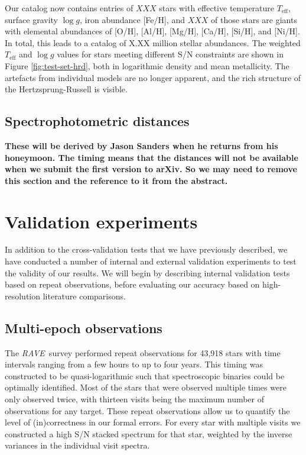 \documentclass[preprint,trackchanges]{aastex}
\newcommand{\acronym}[1]{{\small{#1}}}
\newcommand{\project}[1]{\textsl{#1}}
\newcommand{\rave}{\project{\acronym{RAVE}}}
\newcommand{\stub}[1]{{\color{blue} \textbf{#1}}}
\newcommand{\teff}{T_{\mathrm{eff}}}
\newcommand{\logg}{\log g}
\begin{document}
Our catalog now contains entries of $XXX$ stars with effective temperature $\teff$,
surface gravity $\logg$, iron abundance [Fe/H], and $XXX$ of those stars are giants
with elemental abundances of [O/H], [Al/H], [Mg/H], [Ca/H], [Si/H], and [Ni/H].
In total, this leads to a catalog of X.XX million stellar abundances. 
The weighted $\teff$ and $\logg$ values for stars meeting different
S/N constraints are shown in Figure \ref{fig:test-set-hrd}, both in logarithmic density
and mean metallicity.  The artefacts from individual models are no longer 
apparent, and the rich structure of the Hertzsprung-Russell is visible.

\subsection{Spectrophotometric distances}
\label{sec:distances}

\stub{These will be derived by Jason Sanders when he returns from his honeymoon.
The timing means that the distances will not be available when we submit the first
version to arXiv. So we may need to remove this section and the reference to it
from the abstract.}

\section{Validation experiments}
\label{sec:validation}


In addition to the cross-validation tests that we have previously described, 
we have conducted a number of internal and external validation experiments to 
test the validity of our results.  We will begin by describing internal validation
tests based on repeat observations, before evaluating our accuracy based on
high-resolution literature comparisons.


\subsection{Multi-epoch observations}
\label{sec:repeat-observations}

The \rave\ survey performed repeat observations for 43,918 stars with time 
intervals ranging from a few hours to up to four years.  This timing was 
constructed to be quasi-logarithmic such that spectroscopic binaries could
be optimally identified. Most of the stars that were observed multiple times
were only observed twice, with thirteen visits being the maximum number 
of observations for any target.  These repeat observations allow us to 
quantify the level of (in)correctness in our formal errors.  For every star
with multiple visits we constructed a high S/N stacked spectrum for that
star, weighted by the inverse variances in the individual visit spectra.
\end{document}
